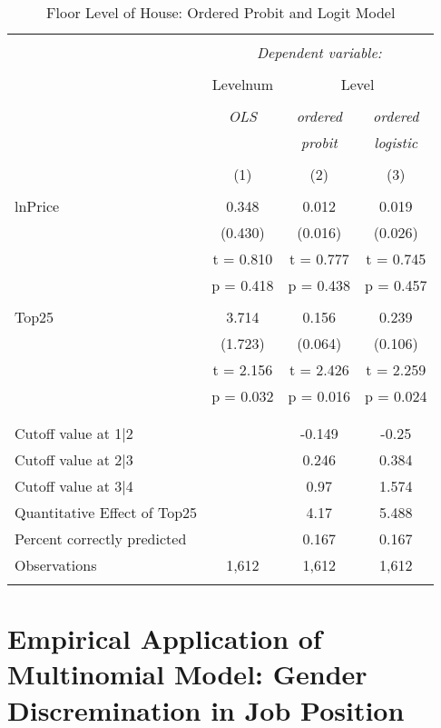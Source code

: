 \documentclass[
  12pt,
]{article}
\begin{document}
\begin{table}[t] \centering 
  \caption{Floor Level of House: Ordered Probit and Logit Model} 
  \label{housing} 
\begin{tabular}{@{\extracolsep{5pt}}lccc} 
\\[-1.8ex]\hline 
\hline \\[-1.8ex] 
 & \multicolumn{3}{c}{\textit{Dependent variable:}} \\ 
\cline{2-4} 
\\[-1.8ex] & Levelnum & \multicolumn{2}{c}{Level} \\ 
\\[-1.8ex] & \textit{OLS} & \textit{ordered} & \textit{ordered} \\ 
 & \textit{} & \textit{probit} & \textit{logistic} \\ 
\\[-1.8ex] & (1) & (2) & (3)\\ 
\hline \\[-1.8ex] 
 lnPrice & 0.348 & 0.012 & 0.019 \\ 
  & (0.430) & (0.016) & (0.026) \\ 
  & t = 0.810 & t = 0.777 & t = 0.745 \\ 
  & p = 0.418 & p = 0.438 & p = 0.457 \\ 
  & & & \\ 
 Top25 & 3.714 & 0.156 & 0.239 \\ 
  & (1.723) & (0.064) & (0.106) \\ 
  & t = 2.156 & t = 2.426 & t = 2.259 \\ 
  & p = 0.032 & p = 0.016 & p = 0.024 \\ 
  & & & \\ 
\hline \\[-1.8ex] 
Cutoff value at 1|2 &  & -0.149 & -0.25 \\ 
Cutoff value at 2|3 &  & 0.246 & 0.384 \\ 
Cutoff value at 3|4 &  & 0.97 & 1.574 \\ 
Quantitative Effect of Top25 &  & 4.17 & 5.488 \\ 
Percent correctly predicted &  & 0.167 & 0.167 \\ 
Observations & 1,612 & 1,612 & 1,612 \\ 
\hline 
\hline \\[-1.8ex] 
\end{tabular} 
\end{table}

\hypertarget{empirical-application-of-multinomial-model-gender-discremination-in-job-position}{%
\section{Empirical Application of Multinomial Model: Gender
Discremination in Job
Position}\label{empirical-application-of-multinomial-model-gender-discremination-in-job-position}}
\end{document}

